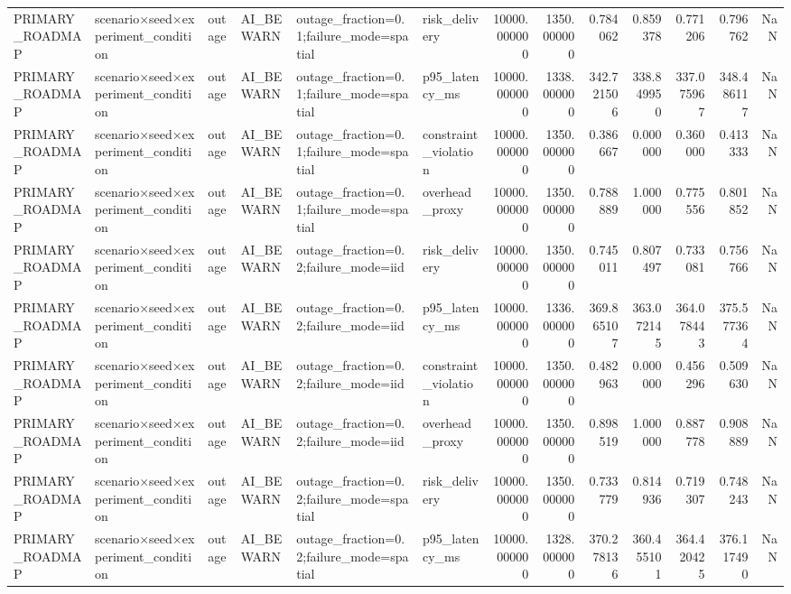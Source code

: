 \begin{tabular}{llllllrrrrrrr}
PRIMARY\_ROADMAP & scenario×seed×experiment\_condition & outage & AI\_BEWARN & outage\_fraction=0.1;failure\_mode=spatial & risk\_delivery & 10000.000000 & 1350.000000 & 0.784062 & 0.859378 & 0.771206 & 0.796762 & NaN \\
PRIMARY\_ROADMAP & scenario×seed×experiment\_condition & outage & AI\_BEWARN & outage\_fraction=0.1;failure\_mode=spatial & p95\_latency\_ms & 10000.000000 & 1338.000000 & 342.721506 & 338.849950 & 337.075967 & 348.486117 & NaN \\
PRIMARY\_ROADMAP & scenario×seed×experiment\_condition & outage & AI\_BEWARN & outage\_fraction=0.1;failure\_mode=spatial & constraint\_violation & 10000.000000 & 1350.000000 & 0.386667 & 0.000000 & 0.360000 & 0.413333 & NaN \\
PRIMARY\_ROADMAP & scenario×seed×experiment\_condition & outage & AI\_BEWARN & outage\_fraction=0.1;failure\_mode=spatial & overhead\_proxy & 10000.000000 & 1350.000000 & 0.788889 & 1.000000 & 0.775556 & 0.801852 & NaN \\
PRIMARY\_ROADMAP & scenario×seed×experiment\_condition & outage & AI\_BEWARN & outage\_fraction=0.2;failure\_mode=iid & risk\_delivery & 10000.000000 & 1350.000000 & 0.745011 & 0.807497 & 0.733081 & 0.756766 & NaN \\
PRIMARY\_ROADMAP & scenario×seed×experiment\_condition & outage & AI\_BEWARN & outage\_fraction=0.2;failure\_mode=iid & p95\_latency\_ms & 10000.000000 & 1336.000000 & 369.865107 & 363.072145 & 364.078443 & 375.577364 & NaN \\
PRIMARY\_ROADMAP & scenario×seed×experiment\_condition & outage & AI\_BEWARN & outage\_fraction=0.2;failure\_mode=iid & constraint\_violation & 10000.000000 & 1350.000000 & 0.482963 & 0.000000 & 0.456296 & 0.509630 & NaN \\
PRIMARY\_ROADMAP & scenario×seed×experiment\_condition & outage & AI\_BEWARN & outage\_fraction=0.2;failure\_mode=iid & overhead\_proxy & 10000.000000 & 1350.000000 & 0.898519 & 1.000000 & 0.887778 & 0.908889 & NaN \\
PRIMARY\_ROADMAP & scenario×seed×experiment\_condition & outage & AI\_BEWARN & outage\_fraction=0.2;failure\_mode=spatial & risk\_delivery & 10000.000000 & 1350.000000 & 0.733779 & 0.814936 & 0.719307 & 0.748243 & NaN \\
PRIMARY\_ROADMAP & scenario×seed×experiment\_condition & outage & AI\_BEWARN & outage\_fraction=0.2;failure\_mode=spatial & p95\_latency\_ms & 10000.000000 & 1328.000000 & 370.278136 & 360.455101 & 364.420425 & 376.117490 & NaN \\

\end{tabular}
